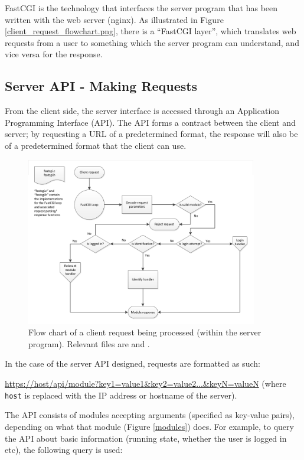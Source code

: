 FastCGI is the technology that interfaces the server program that has been written with the web server (nginx). As illustrated in Figure \ref{client_request_flowchart.png}, there is a ``FastCGI layer'', which translates web requests from a user to something which the server program can understand, and vice versa for the response. 

\subsection{Server API - Making Requests}\label{API}

From the client side, the server interface is accessed through an Application Programming Interface (API). The API forms a contract between the client and server; by requesting a URL of a predetermined format, the response will also be of a predetermined format that the client can use.

\begin{figure}[H]
	\centering
	\includegraphics[width=0.9\textwidth]{figures/fastcgi-flow-chart.png}
	\caption{Flow chart of a client request being processed (within the server program). Relevant files are  and .} 
	\label{fastcgi-flow-chart.png}
\end{figure}

In the case of the server API designed, requests are formatted as such: 

\url{https://host/api/module?key1=value1&key2=value2...&keyN=valueN} (where \verb/host/ is replaced with the IP address or hostname of the server).


The API consists of modules accepting arguments (specified as key-value pairs), depending on what that module (Figure \ref{modules}) does. For example, to query the API about basic information (running state, whether the user is logged in etc), the following query is used:

